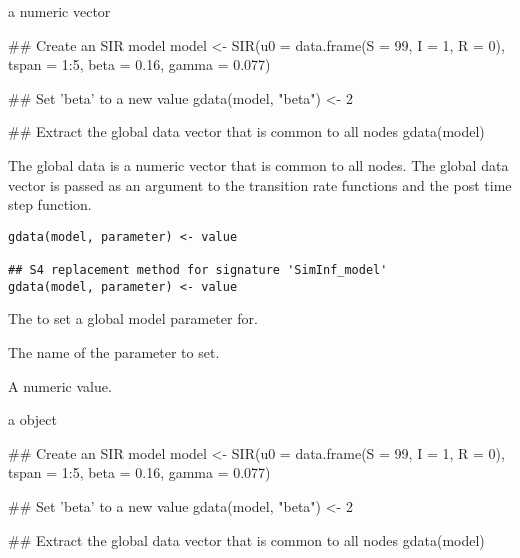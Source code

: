 \documentclass[letterpaper]{book}
\begin{document}
%
\begin{Value}
a numeric vector
\end{Value}
%
\begin{Examples}
\begin{ExampleCode}
## Create an SIR model
model <- SIR(u0 = data.frame(S = 99, I = 1, R = 0),
             tspan = 1:5, beta = 0.16, gamma = 0.077)

## Set 'beta' to a new value
gdata(model, "beta") <- 2

## Extract the global data vector that is common to all nodes
gdata(model)
\end{ExampleCode}
\end{Examples}
%
\begin{Description}
The global data is a numeric vector that is common to all nodes.
The global data vector is passed as an argument to the transition
rate functions and the post time step function.
\end{Description}
%
\begin{Usage}
\begin{verbatim}
gdata(model, parameter) <- value

## S4 replacement method for signature 'SimInf_model'
gdata(model, parameter) <- value
\end{verbatim}
\end{Usage}
%
\begin{Arguments}
\begin{ldescription}
\item[\code{model}] The  to set a global model parameter for.

\item[\code{parameter}] The name of the parameter to set.

\item[\code{value}] A numeric value.
\end{ldescription}
\end{Arguments}
%
\begin{Value}
a  object
\end{Value}
%
\begin{Examples}
\begin{ExampleCode}
## Create an SIR model
model <- SIR(u0 = data.frame(S = 99, I = 1, R = 0),
             tspan = 1:5, beta = 0.16, gamma = 0.077)

## Set 'beta' to a new value
gdata(model, "beta") <- 2

## Extract the global data vector that is common to all nodes
gdata(model)
\end{ExampleCode}
\end{Examples}
\end{document}
